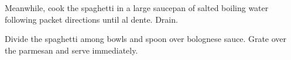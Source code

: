 \begin{recipe}
\begin{instructions}
\item Meanwhile, cook the spaghetti in a large saucepan of salted boiling water following packet directions until al dente. Drain.

\item Divide the spaghetti among bowls and spoon over bolognese sauce. Grate over the parmesan and serve immediately.

\end{instructions}


\end{recipe}